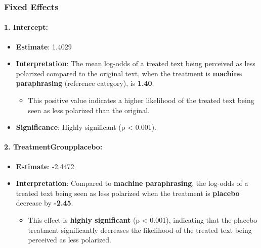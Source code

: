 \documentclass[
]{article}
\providecommand{\tightlist}{%
  \setlength{\itemsep}{0pt}\setlength{\parskip}{0pt}}
\begin{document}
\subsubsection{\texorpdfstring{\textbf{Fixed
Effects}}{Fixed Effects}}\label{fixed-effects-1}

\paragraph{\texorpdfstring{\textbf{1.
Intercept:}}{1. Intercept:}}\label{intercept-1}

\begin{itemize}
\tightlist
\item
  \textbf{Estimate}: 1.4029
\item
  \textbf{Interpretation}: The mean log-odds of a treated text being
  perceived as less polarized compared to the original text, when the
  treatment is \textbf{machine paraphrasing} (reference category), is
  \textbf{1.40}.

  \begin{itemize}
  \tightlist
  \item
    This positive value indicates a higher likelihood of the treated
    text being seen as less polarized than the original.
  \end{itemize}
\item
  \textbf{Significance}: Highly significant (p \textless{} 0.001).
\end{itemize}

\paragraph{\texorpdfstring{\textbf{2.
TreatmentGroupplacebo:}}{2. TreatmentGroupplacebo:}}\label{treatmentgroupplacebo-1}

\begin{itemize}
\tightlist
\item
  \textbf{Estimate}: -2.4472
\item
  \textbf{Interpretation}: Compared to \textbf{machine paraphrasing},
  the log-odds of a treated text being seen as less polarized when the
  treatment is \textbf{placebo} decrease by \textbf{-2.45}.

  \begin{itemize}
  \tightlist
  \item
    This effect is \textbf{highly significant} (p \textless{} 0.001),
    indicating that the placebo treatment significantly decreases the
    likelihood of the treated text being perceived as less polarized.
  \end{itemize}
\end{itemize}
\end{document}
